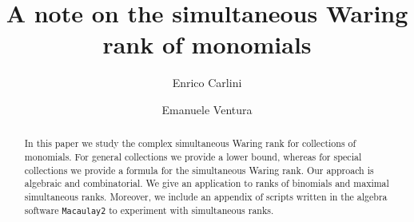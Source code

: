 \documentclass{amsart}
\title{A note on the simultaneous Waring rank of monomials}
\author{Enrico Carlini}
\author{Emanuele Ventura}
\theoremstyle{plain}
\theoremstyle{definition}
\theoremstyle{remark}
\begin{document}
\maketitle

\date{}


\begin{abstract}

In this paper we study the complex simultaneous Waring rank for collections of monomials. For general collections we provide a lower bound, whereas for special collections we provide a formula for the simultaneous Waring rank. Our approach is algebraic and combinatorial. We give an application to ranks of binomials and maximal simultaneous ranks. Moreover, we include an appendix of scripts written in the algebra software \texttt{Macaulay2} to experiment with simultaneous ranks.

\end{abstract}


\end{document}

